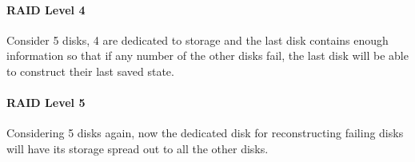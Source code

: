 \documentclass{article}
\begin{document}
\paragraph{RAID Level 4} Consider 5 disks, 4 are dedicated to storage and the last disk contains enough information so that if any number of the other disks fail, the last disk will be able to construct their last saved state.

\paragraph{RAID Level 5} Considering 5 disks again, now the dedicated disk for reconstructing failing disks will have its storage spread out to all the other disks.
\end{document}
